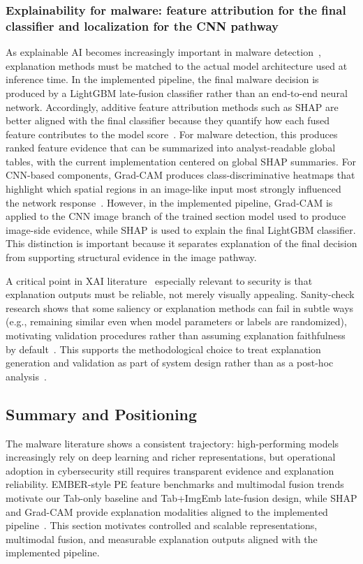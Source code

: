 \documentclass[conference]{IEEEtran}
\begin{document}
\subsubsection{Explainability for malware: feature attribution for the final classifier and localization for the CNN pathway}

As explainable AI becomes increasingly important in malware detection~\cite{KBSSSK2025,NSDSP2025}, explanation methods must be matched to the actual model architecture used at inference time.
In the implemented pipeline, the final malware decision is produced by a LightGBM late-fusion classifier rather than an end-to-end neural network.
Accordingly, additive feature attribution methods such as SHAP are better aligned with the final classifier because they quantify how each fused feature contributes to the model score~\cite{LL2017}.
For malware detection, this produces ranked feature evidence that can be summarized into analyst-readable global tables, with the current implementation centered on global SHAP summaries.
For CNN-based components, Grad-CAM produces class-discriminative heatmaps that highlight which spatial regions in an image-like input most strongly influenced the network response~\cite{SCDVPB2017}.
However, in the implemented pipeline, Grad-CAM is applied to the CNN image branch of the trained section model used to produce image-side evidence, while SHAP is used to explain the final LightGBM classifier.
This distinction is important because it separates explanation of the final decision from supporting structural evidence in the image pathway.

A critical point in XAI literature~\cite{DJRLXSWB2020,NSDSP2025} especially relevant to security is that explanation outputs must be reliable, not merely visually appealing.
Sanity-check research shows that some saliency or explanation methods can fail in subtle ways (e.g., remaining similar even when model parameters or labels are randomized), motivating validation procedures rather than assuming explanation faithfulness by default~\cite{JJMIMB2018}.
This supports the methodological choice to treat explanation generation and validation as part of system design rather than as a post-hoc analysis~\cite{SCDVPB2017,LL2017,JJMIMB2018}.

\subsection{Summary and Positioning}

The malware literature shows a consistent trajectory: high-performing models increasingly rely on deep learning and richer representations, but operational adoption in cybersecurity still requires transparent evidence and explanation reliability.
EMBER-style PE feature benchmarks and multimodal fusion trends motivate our Tab-only baseline and Tab+ImgEmb late-fusion design, while SHAP and Grad-CAM provide explanation modalities aligned to the implemented pipeline~\cite{JMGPR2024,SZS25,SCDVPB2017,LL2017,HP20182018,NKJMB2011}.
This section motivates controlled and scalable representations, multimodal fusion, and measurable explanation outputs aligned with the implemented pipeline.
\end{document}
